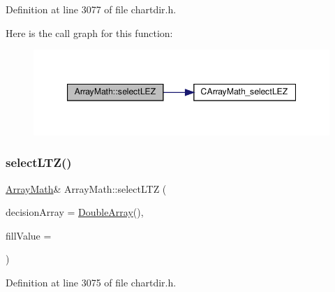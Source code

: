 Definition at line 3077 of file chartdir.\+h.

Here is the call graph for this function\+:
\nopagebreak
\begin{figure}[H]
\begin{center}
\leavevmode
\includegraphics[width=347pt]{class_array_math_a63ec8c97034104b0ede0227683583eac_cgraph}
\end{center}
\end{figure}
\mbox{\label{class_array_math_ae10389934cacf3913e69b71c79fe5ae9}} 
\subsubsection{\texorpdfstring{select\+L\+T\+Z()}{selectLTZ()}}
{\footnotesize\ttfamily \hyperlink{class_array_math}{Array\+Math}\& Array\+Math\+::select\+L\+TZ (\begin{DoxyParamCaption}\item[{\hyperlink{class_double_array}{Double\+Array}}]{decision\+Array = {\ttfamily \hyperlink{class_double_array}{Double\+Array}()},  }\item[{double}]{fill\+Value = {} }\end{DoxyParamCaption})\hspace{0.3cm}{\ttfamily [inline]}}



Definition at line 3075 of file chartdir.\+h.

